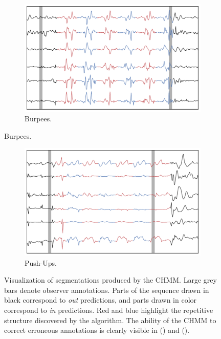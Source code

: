 \documentclass[12pt]{report}
\newcommand{\1}[0]{\mathbbm{1}}
\begin{document}
\begin{figure}[H]
    \centering
    \ContinuedFloat
    \begin{subfigure}{0.82\textwidth}
        \includegraphics[width=\textwidth]{img/segmentation/burpee.pdf}
        \caption{Burpees.}
        \label{fig:actseg:burpee}
    \end{subfigure}
\end{figure}

\begin{figure}[H]
    \centering
    \ContinuedFloat
    \begin{subfigure}{0.82\textwidth}
        \includegraphics[width=\textwidth]{img/segmentation/push_up.pdf}
        \caption{Push-Ups.}
        \label{fig:actseg:push-up}
    \end{subfigure}
    \caption[Unsupervised exercise segmentation]{
        Visualization of segmentations produced by the CHMM.
        Large grey bars denote observer annotations. Parts of the sequence drawn
        in black correspond to \emph{out} predictions, and parts drawn in color
        correspond to \emph{in} predictions. Red and blue highlight the repetitive structure
        discovered by the algorithm. The ability of the CHMM to correct erroneous
        annotations is clearly visible in () and ().
    }
    \label{fig:actseg}
\end{figure}
\end{document}
